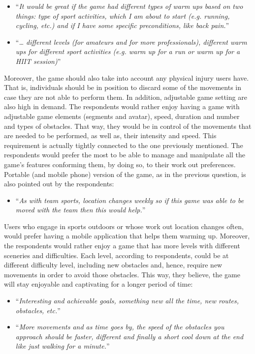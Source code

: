 \begin{itemize}
\item ``\textit{It would be great if the game had different types of warm ups based on two things:  type of sport activities, which I am about to start (e.g. running, cycling, etc.) and if I have some specific preconditions, like back pain.}''
\item ``\textit{… different levels (for amateurs and for more professionals), different warm ups for different sport activities (e.g. warm up for a run or warm up for a HIIT session)}''
\end{itemize}
Moreover, the game should also take into account any physical injury users have. That is, individuals should be in position to discard some of the movements in case they are not able to perform them. In addition, adjustable game setting are also high in demand. The respondents would rather enjoy having a game with adjustable game elements (segments and avatar), speed, duration and number and types of obstacles. That way, they would be in control of the movements that are needed to be performed, as well as, their intensity and speed. This requirement is actually tightly connected to the one previously mentioned. The respondents would prefer the most to be able to manage and manipulate all the game's features conforming them, by doing so, to their work out preferences. Portable (and mobile phone) version of the game, as in the previous question, is also pointed out by the respondents:
\begin{itemize}
\item ``\textit{As with team sports, location changes weekly so if this game was able to be moved with the team then this would help.}''
\end{itemize} 
Users who engage in sports outdoors or whose work out location changes often, would prefer having a mobile application that helps them warming up. Moreover, the respondents would rather enjoy a game that has more levels with different sceneries and difficulties. Each level, according to respondents, could be at different difficulty level, including new obstacles and, hence, require new movements in order to avoid those obstacles. This way, they believe, the game will stay enjoyable and captivating for a longer period of time:
\begin{itemize}
\item ``\textit{Interesting and achievable goals, something new all the time, new routes, obstacles, etc.}''
\item ``\textit{More movements and as time goes by, the speed of the obstacles you approach should be faster, different and finally a short cool down at the end like just walking for a minute.}''
\end{itemize}
